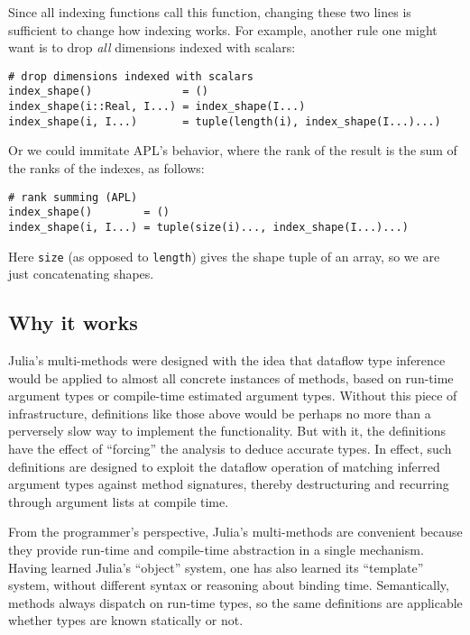 \documentclass[preprint]{sigplanconf}
\newcommand{\code}[1]{\texttt{#1}}
\begin{document}
Since all indexing functions call this function, changing these two lines is
sufficient to change how indexing works. For example, another rule one might
want is to drop \emph{all} dimensions indexed with scalars:

{\small
\begin{verbatim}
# drop dimensions indexed with scalars
index_shape()              = ()
index_shape(i::Real, I...) = index_shape(I...)
index_shape(i, I...)       = tuple(length(i), index_shape(I...)...)
\end{verbatim}
}

Or we could immitate APL's behavior, where the rank of the result is the sum
of the ranks of the indexes, as follows:

{\small
\begin{verbatim}
# rank summing (APL)
index_shape()        = ()
index_shape(i, I...) = tuple(size(i)..., index_shape(I...)...)
\end{verbatim}
}

Here \code{size} (as opposed to \code{length}) gives the shape tuple of an array,
so we are just concatenating shapes.


\subsection{Why it works}

Julia's multi-methods were designed with the idea that dataflow type inference
\cite{Cousot:1977} \cite{kaplanullman}
would be applied to almost all concrete instances of methods, based on
run-time argument types or compile-time estimated argument types. Without this
piece of infrastructure, definitions like those above would be perhaps no more
than a perversely slow way to implement the functionality. But with it, the
definitions have the effect of ``forcing'' the analysis to deduce accurate
types. In effect, such definitions are designed to exploit the dataflow
operation of matching inferred argument types against method signatures,
thereby destructuring and recurring through argument lists at compile time.

From the programmer's perspective, Julia's multi-methods are convenient
because they provide run-time and compile-time abstraction in a single
mechanism. Having learned Julia's ``object'' system, one has also learned
its ``template'' system, without different syntax or reasoning about
binding time. Semantically, methods always dispatch on run-time
types, so the same definitions are applicable whether types are known
statically or not.
\end{document}
